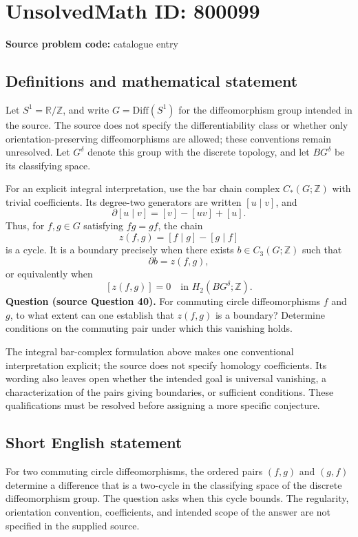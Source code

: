 \documentclass[11pt]{article}
\newcommand{\Z}{\mathbb{Z}}
\newcommand{\R}{\mathbb{R}}
\begin{document}
\section*{UnsolvedMath ID: 800099}
\textbf{Source problem code:} catalogue entry
\subsection{Definitions and mathematical statement}
Let \(S^1=\R/\Z\), and write \(G=\mathrm{Diff}(S^1)\) for the diffeomorphism group intended in the source. The source does not specify the differentiability class or whether only orientation-preserving diffeomorphisms are allowed; these conventions remain unresolved. Let \(G^\delta\) denote this group with the discrete topology, and let \(BG^\delta\) be its classifying space.

For an explicit integral interpretation, use the bar chain complex \(C_*(G;\Z)\) with trivial coefficients. Its degree-two generators are written \([u\mid v]\), and
\[
\partial [u\mid v]=[v]-[uv]+[u].
\]
Thus, for \(f,g\in G\) satisfying \(fg=gf\), the chain
\[
z(f,g)=[f\mid g]-[g\mid f]
\]
is a cycle. It is a boundary precisely when there exists \(b\in C_3(G;\Z)\) such that
\[
\partial b=z(f,g),
\]
or equivalently when
\[
[z(f,g)]=0\quad\text{in }H_2(BG^\delta;\Z).
\]
\textbf{Question (source Question 40).} For commuting circle diffeomorphisms \(f\) and \(g\), to what extent can one establish that \(z(f,g)\) is a boundary? Determine conditions on the commuting pair under which this vanishing holds.

The integral bar-complex formulation above makes one conventional interpretation explicit; the source does not specify homology coefficients. Its wording also leaves open whether the intended goal is universal vanishing, a characterization of the pairs giving boundaries, or sufficient conditions. These qualifications must be resolved before assigning a more specific conjecture.
\subsection{Short English statement}
For two commuting circle diffeomorphisms, the ordered pairs \((f,g)\) and \((g,f)\) determine a difference that is a two-cycle in the classifying space of the discrete diffeomorphism group. The question asks when this cycle bounds. The regularity, orientation convention, coefficients, and intended scope of the answer are not specified in the supplied source.
\end{document}
